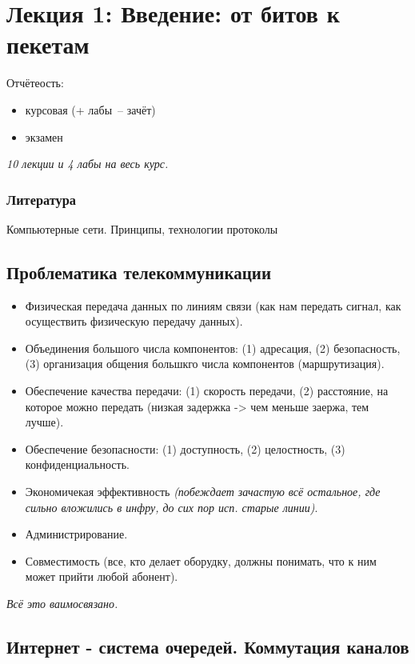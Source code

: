 \section{Лекция 1: Введение: от битов к пекетам}

Отчётеость:
\begin{itemize}
   \item курсовая (+ лабы~-- зачёт)
   \item экзамен
\end{itemize}

\textit{10 лекции и 4 лабы на весь курс.}

\subsubsection{Литература}

Компьютерные сети. Принципы, технологии протоколы

\subsection{Проблематика телекоммуникации}

\begin{itemize}
   \item Физическая передача данных по линиям связи (как нам передать сигнал, как осуществить физическую передачу данных).
   \item Объединения большого числа компонентов: (1) адресация, (2) безопасность, (3) организация общения большкго числа компонентов (маршрутизация).
   \item Обеспечение качества передачи: (1) скорость передачи, (2) расстояние, на которое можно передать (низкая задержка -> чем меньше заержа, тем лучше).
   \item Обеспечение безопасности: (1) доступность, (2) целостность, (3) конфиденциальность.
   \item Экономичекая эффективность \textit{(побеждает зачастую всё остальное, где сильно вложились в инфру, до сих пор исп. старые линии)}.
   \item Администрирование.
   \item Совместимость (все, кто делает оборудку, должны понимать, что к ним может прийти любой абонент).
\end{itemize}

\textit{Всё это ваимосвязано.}

\subsection{Интернет - система очередей. Коммутация каналов}

